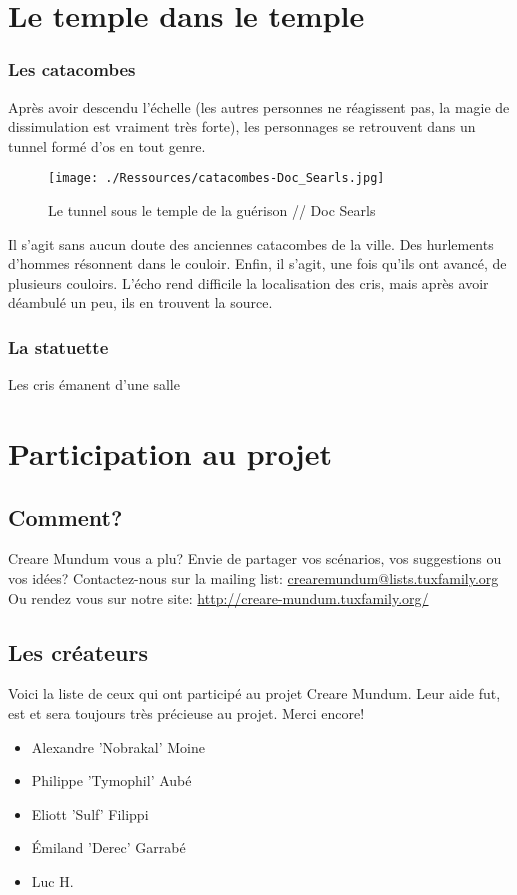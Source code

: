 \documentclass[a4paper, 11pt]{article}
\begin{document}
\section{Le temple dans le temple} 
\subsubsection{Les catacombes}
Après avoir descendu l'échelle (les autres personnes ne réagissent pas, la magie de dissimulation est vraiment très forte), les personnages se retrouvent dans un tunnel formé d'os en tout genre.

\begin{figure}[ht]
\begin{center}
\hypertarget{catacombes}{}
\texttt{[image: ./Ressources/catacombes-Doc\_Searls.jpg]}
\caption{Le tunnel sous le temple de la guérison // Doc Searls }
\end{center}
\end{figure}

Il s'agit sans aucun doute des anciennes catacombes de la ville. Des hurlements d'hommes résonnent dans le couloir. Enfin, il s'agit, une fois qu'ils ont avancé, de plusieurs couloirs. L'écho rend difficile la localisation des cris, mais après avoir déambulé un peu, ils en trouvent la source.

\subsubsection{La statuette}
Les cris émanent d'une salle


\newpage
\section{Participation au projet}
\subsection{Comment?}
\hypertarget{participation}{}
Creare Mundum vous a plu? 
Envie de partager vos scénarios, vos suggestions ou vos idées?
\newline
Contactez-nous sur la mailing list: \href {mailto:crearemundum@lists.tuxfamily.org}{crearemundum@lists.tuxfamily.org}
\newline
Ou rendez vous sur notre site: \href {http://creare-mundum.tuxfamily.org/} {http://creare-mundum.tuxfamily.org/}
\subsection{Les créateurs}
Voici la liste de ceux qui ont participé au projet Creare Mundum. Leur aide fut, est et sera toujours très précieuse au projet. Merci encore!  
\begin{itemize}
\item Alexandre ’Nobrakal’ Moine 
\item Philippe ’Tymophil’ Aubé 
\item Eliott ’Sulf’ Filippi
\item Émiland ’Derec’ Garrabé
\item Luc H.
\end{itemize}
\end{document}
